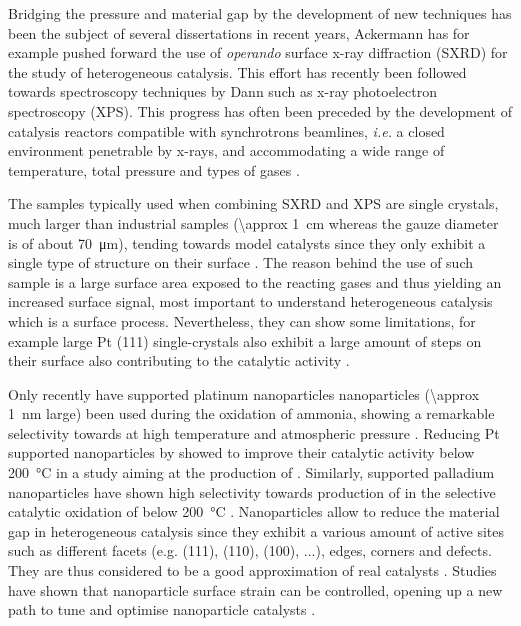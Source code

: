 Bridging the pressure and material gap by the development of new techniques has been the subject of several dissertations in recent years, Ackermann \parencite*{Ackermann2007} has for example pushed forward the use of \textit{operando} surface x-ray diffraction (SXRD) for the study of heterogeneous catalysis.
This effort has recently been followed towards spectroscopy techniques by Dann \parencite*{Dann2019} such as x-ray photoelectron spectroscopy (XPS).
This progress has often been preceded by the development of catalysis reactors compatible with synchrotrons beamlines, \textit{i.e.} a closed environment penetrable by x-rays, and accommodating a wide range of temperature, total pressure and types of gases \parencite{VanRijn2010}.

The samples typically used when combining SXRD and XPS are single crystals, much larger than industrial samples (\qty{\approx 1}{\cm} whereas the gauze diameter is of about \qty{70}{\um}), tending towards model catalysts since they only exhibit a single type of structure on their surface \parencite{Goodman1994}.
The reason behind the use of such sample is a large surface area exposed to the reacting gases and thus yielding an increased surface signal, most important to understand heterogeneous catalysis which is a surface process.
Nevertheless, they can show some limitations, for example large Pt (111) single-crystals also exhibit a large amount of steps on their surface also contributing to the catalytic activity \parencite{CalleVallejo2017}.

Only recently have supported platinum nanoparticles nanoparticles (\qty{\approx 1}{\nm} large) been used during the oxidation of ammonia, showing a remarkable selectivity towards  at high temperature and atmospheric pressure \parencite{Schaffer2013}.
Reducing Pt supported nanoparticles by  showed to improve their catalytic activity below \qty{200}{\degreeCelsius} in a study aiming at the production of  \parencite{Svintsitskiy2020}.
Similarly, supported palladium nanoparticles have shown high selectivity towards production of  in the selective catalytic oxidation of  below \qty{200}{\degreeCelsius} \parencite{Dann2019}.
Nanoparticles allow to reduce the material gap in heterogeneous catalysis since they exhibit a various amount of active sites such as different facets (e.g. (111), (110), (100), ...), edges, corners and defects.
They are thus considered to be a good approximation of real catalysts \parencite{Somorjai2007, Molenbroek2009, Cuenya2010, Kwangjin2012, Schauermann2013}.
Studies have shown that nanoparticle surface strain can be controlled, opening up a new path to tune and optimise nanoparticle catalysts \parencite{Zhang2014, Sneed2015, Wang2016}.

